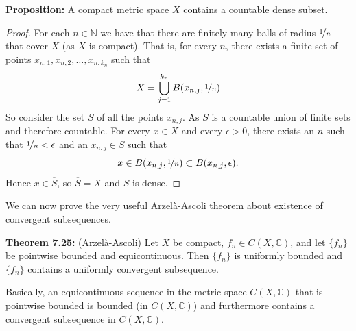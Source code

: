 \documentclass[12pt]{book}
\newcommand{\C}{{\mathbb{C}}}
\newcommand{\N}{{\mathbb{N}}}
\theoremstyle{plain}
\theoremstyle{remark}
\theoremstyle{definition}
\theoremstyle{exercise}
\theoremstyle{example}
\begin{document}
\medskip

\textbf{Proposition:}
A compact metric space $X$ contains a countable dense subset.

\medskip

\begin{proof}
For each $n \in \N$ we have that there are finitely many
balls of radius $\nicefrac{1}{n}$ that cover $X$ (as $X$ is compact). That is,
for every $n$, there exists
a finite set of points $x_{n,1},x_{n,2},\ldots,x_{n,k_n}$ such that
$$
X= \bigcup_{j=1}^{k_n} B(x_{n,j},\nicefrac{1}{n})
$$
So consider the set $S$ of all the points $x_{n,j}$.  As $S$ is a countable
union of finite sets and therefore countable.  For every $x \in X$
and every $\epsilon > 0$, there exists an $n$ such that
$\nicefrac{1}{n} < \epsilon$ and an $x_{n,j} \in S$ such that
$$
x \in B(x_{n,j},\nicefrac{1}{n}) \subset B(x_{n,j},\epsilon) .
$$
Hence $x \in \overline{S}$, so $\overline{S} = X$ and $S$ is dense.
\end{proof}

\medskip

We can now prove the very useful Arzel\`a-Ascoli theorem about existence
of convergent subsequences.

\medskip

\textbf{Theorem 7.25:} (Arzel\`a-Ascoli)
Let $X$ be compact, $f_n \in C(X,\C)$, and let $\{ f_n \}$
be pointwise bounded and equicontinuous.  Then
$\{f_n\}$ is uniformly bounded and $\{ f_n \}$ contains a uniformly
convergent subsequence.

\medskip

Basically, an equicontinuous sequence in the metric space
$C(X,\C)$ that is pointwise bounded
is bounded (in $C(X,\C)$) and furthermore contains a convergent
subsequence in $C(X,\C)$.

\medskip
\end{document}
